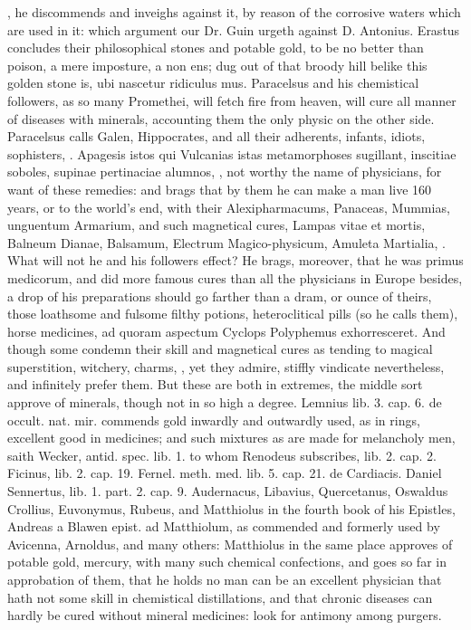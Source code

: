{, he discommends and inveighs against it, by reason
of the corrosive waters which are used in it: which argument our Dr.
Guin urgeth against D. Antonius. Erastus concludes their
philosophical stones and potable gold, \etc{} to be no better than poison,
a mere imposture, a non ens; dug out of that broody hill belike this
golden stone is, ubi nascetur ridiculus mus. Paracelsus and his
chemistical followers, as so many Promethei, will fetch fire from
heaven, will cure all manner of diseases with minerals, accounting them
the only physic on the other side. Paracelsus calls Galen,
Hippocrates, and all their adherents, infants, idiots, sophisters, \etc{}.
Apagesis istos qui Vulcanias istas metamorphoses sugillant, inscitiae
soboles, supinae pertinaciae alumnos, \etc{}, not worthy the name of
physicians, for want of these remedies: and brags that by them he can
make a man live 160 years, or to the world's end, with their
Alexipharmacums, Panaceas, Mummias, unguentum Armarium, and such
magnetical cures, Lampas vitae et mortis, Balneum Dianae, Balsamum,
Electrum Magico-physicum, Amuleta Martialia, \etc{}. What will not he and
his followers effect? He brags, moreover, that he was primus medicorum,
and did more famous cures than all the physicians in Europe besides,
a drop of his preparations should go farther than a dram, or
ounce of theirs, those loathsome and fulsome filthy potions,
heteroclitical pills (so he calls them), horse medicines, ad quoram
aspectum Cyclops Polyphemus exhorresceret. And though some condemn
their skill and magnetical cures as tending to magical superstition,
witchery, charms, \etc{}, yet they admire, stiffly vindicate nevertheless,
and infinitely prefer them. But these are both in extremes, the middle
sort approve of minerals, though not in so high a degree. Lemnius lib.
3. cap. 6. de occult. nat. mir. commends gold inwardly and outwardly
used, as in rings, excellent good in medicines; and such mixtures as
are made for melancholy men, saith Wecker, antid. spec. lib. 1. to whom
Renodeus subscribes, lib. 2. cap. 2. Ficinus, lib. 2. cap. 19. Fernel.
meth. med. lib. 5. cap. 21. de Cardiacis. Daniel Sennertus, lib. 1.
part. 2. cap. 9. Audernacus, Libavius, Quercetanus, Oswaldus Crollius,
Euvonymus, Rubeus, and Matthiolus in the fourth book of his Epistles,
Andreas a Blawen epist. ad Matthiolum, as commended and formerly used
by Avicenna, Arnoldus, and many others: Matthiolus in the same
place approves of potable gold, mercury, with many such chemical
confections, and goes so far in approbation of them, that he holds
 no man can be an excellent physician that hath not some skill in
chemistical distillations, and that chronic diseases can hardly be
cured without mineral medicines: look for antimony among purgers.

}
